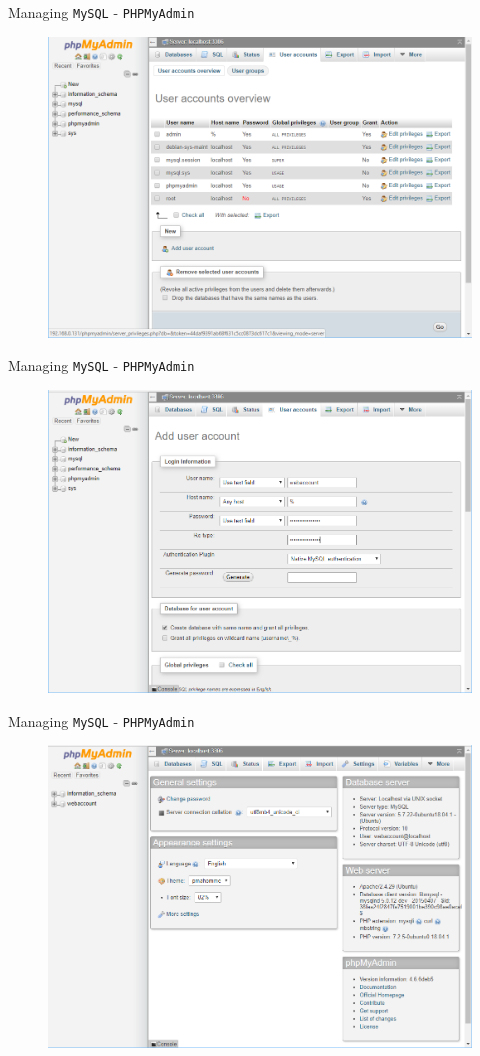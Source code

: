 \documentclass[xcolor=table,aspectratio=169]{beamer}
\begin{document}
\begin{frame}{Managing \texttt{MySQL} - \texttt{PHPMyAdmin}}
  \begin{figure}
    \begin{center}
      \includegraphics[width=0.6\linewidth]{Accounts.png}
    \end{center}
  \end{figure}
\end{frame}

\begin{frame}{Managing \texttt{MySQL} - \texttt{PHPMyAdmin}}
  \begin{figure}
    \begin{center}
      \includegraphics[width=0.6\linewidth]{Accounts2.png}
    \end{center}
  \end{figure}
\end{frame}

\begin{frame}{Managing \texttt{MySQL} - \texttt{PHPMyAdmin}}
  \begin{figure}
    \begin{center}
      \includegraphics[width=0.6\linewidth]{Accounts3.png}
    \end{center}
  \end{figure}
\end{frame}
\end{document}
